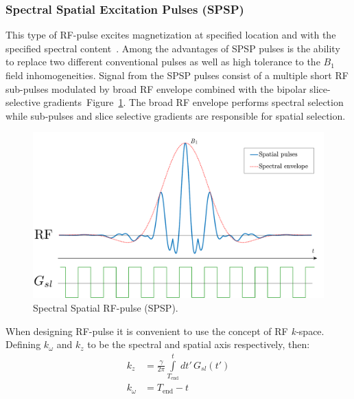 \subsubsection{Spectral Spatial Excitation Pulses (SPSP)}
This type of RF-pulse excites magnetization at specified location and with the specified spectral content~\cite{Schick:1998hu, Block:1997cv}. 
Among the advantages of SPSP pulses is the ability to replace two different conventional pulses as well as high tolerance to the $B_1$ field inhomogeneities. 
Signal from the SPSP pulses consist of a multiple short RF sub-pulses modulated by broad RF envelope combined with the bipolar slice-selective gradients~Figure~\ref{fig:SPSP}. 
The broad RF envelope performs spectral selection while sub-pulses and slice selective gradients are responsible for spatial selection.
\begin{figure}[!ht]
\vspace{+0.2cm}
\centering
\includegraphics[scale=.35]{Figures/SPSP.pdf}
\caption[Spectral Spatial RF-pulse]{Spectral Spatial RF-pulse (SPSP).}
\label{fig:SPSP}
\end{figure}
When designing RF-pulse it is convenient to use the concept of RF \mbox{\textit{k-}space}. 
Defining $k_{\omega}$ and $k_{z}$ to be the spectral and spatial axis respectively, then:
\begin{equation}\label{eq: SPSP_kspace}
\begin{aligned}
	k_z &= \frac{\gamma}{2 \pi}\int\limits_{T_{\mathrm{end}}}^t dt' \, G_{sl}(t')\\
	k_{\omega} &= T_{\mathrm{end}}-t
\end{aligned}
\end{equation}
